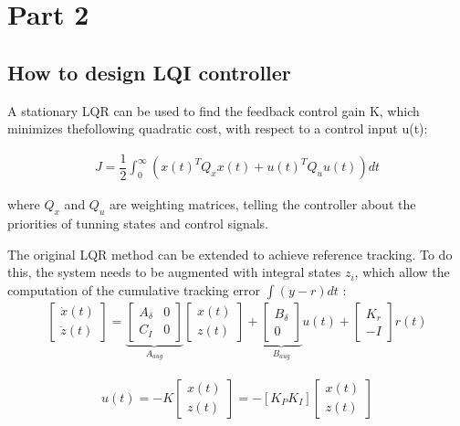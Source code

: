 \section{Part 2}
\subsection{How to design LQI controller}

A stationary LQR can be used to find the feedback control gain K, which minimizes thefollowing quadratic cost, with respect to a control input u(t):

\begin{equation}
    \begin{aligned}
        J=\dfrac{1}{2}\int_0^\infty\left(x(t)^TQ_xx(t)+u(t)^TQ_uu(t)\right)dt
    \end{aligned}
\end{equation}

where $ Q_x $ and $ Q_u $ are weighting matrices, telling the controller about  the priorities of tunning states and control signals.

The original LQR method can be extended to achieve reference tracking. To do this, the system needs to be augmented with integral states $z_i$, which allow the computation of the cumulative tracking error $ \int (y-r)dt $ :
\begin{equation}
    \begin{aligned}
        \begin{bmatrix}
             \dot{x}(t)\\\dot{z}(t)\end{bmatrix}=\underbrace{\begin{bmatrix}A_\delta&0\\C_I&0\end{bmatrix}}_{A_{aug}}\begin{bmatrix}x(t)\\z(t)\end{bmatrix}+\underbrace{\begin{bmatrix}B_\delta\\0\end{bmatrix}}_{B_{aug}}u(t)+\begin{bmatrix}K_r\\-I\end{bmatrix}r(t)
    \end{aligned}
\end{equation}

\begin{equation}
    \begin{aligned}
        u(t)=-K\begin{bmatrix}x(t)\\z(t)\end{bmatrix}=-[K_PK_I]\begin{bmatrix}x(t)\\z(t)\end{bmatrix}
    \end{aligned}
\end{equation}

